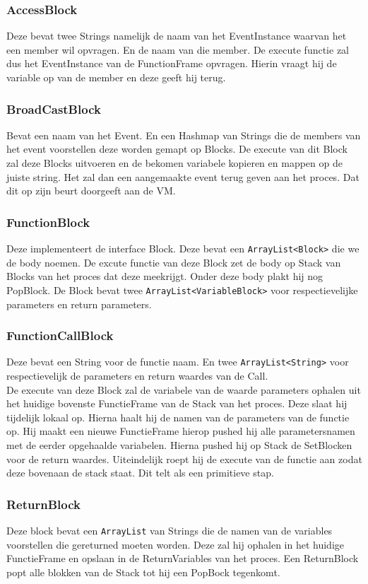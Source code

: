 \documentclass[]{article}
\begin{document}
\subsubsection{AccessBlock}
 Deze bevat twee Strings namelijk de naam van het EventInstance waarvan het een member wil opvragen. En de naam van die member. De execute functie zal dus het EventInstance van de FunctionFrame opvragen. Hierin vraagt hij de variable op van de member en deze geeft hij terug.
\subsubsection{BroadCastBlock}
Bevat een naam van het Event. En een Hashmap \cite{hashmap} van Strings die de members van het event voorstellen deze worden gemapt op Blocks. De execute van dit Block zal deze Blocks uitvoeren en de bekomen variabele kopieren en mappen op de juiste string. Het zal dan een aangemaakte event terug geven aan het proces. Dat dit op zijn beurt doorgeeft aan de VM.
\subsubsection{FunctionBlock}
Deze implementeert de interface Block. Deze bevat een \texttt{ArrayList<Block>} \cite{arraylist} die we de body noemen. De excute functie van deze Block zet de body op Stack van Blocks van het proces dat deze meekrijgt. Onder deze body plakt hij nog PopBlock. De Block bevat twee \texttt{ArrayList<VariableBlock>} \cite{arraylist} voor respectievelijke parameters en return parameters.
\subsubsection{FunctionCallBlock}
Deze bevat een String voor de functie naam. En twee \texttt{ArrayList<String>} \cite{arraylist} voor respectievelijk de parameters en return waardes van de Call.\\ De execute van deze Block zal de variabele van de waarde parameters ophalen uit het huidige bovenste FunctieFrame van de Stack van het proces. Deze slaat hij tijdelijk lokaal op. Hierna haalt hij de namen van de parameters van de functie op. Hij maakt een nieuwe FunctieFrame hierop pushed hij alle parametersnamen met de eerder opgehaalde variabelen. Hierna pushed hij op Stack de SetBlocken voor de return waardes. Uiteindelijk roept hij de execute van de functie aan zodat deze bovenaan de stack staat. Dit telt als een primitieve stap.
\subsubsection{ReturnBlock}
Deze block bevat een \texttt{ArrayList} \cite{arraylist} van Strings die de namen van de variables voorstellen die gereturned moeten worden. Deze zal hij ophalen in het huidige FunctieFrame en opslaan in de ReturnVariables van het proces. Een ReturnBlock popt alle blokken van de Stack tot hij een PopBock tegenkomt.
\end{document}
